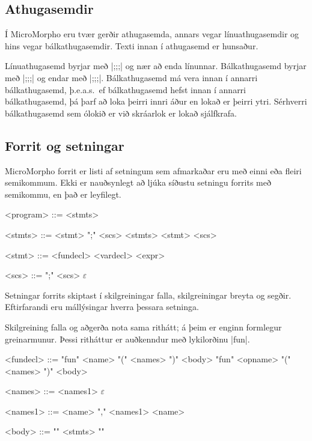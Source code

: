 \documentclass[12pt]{article}
\makeatletter
\newenvironment{bnf}[2]{%
    \setlength{\grammarindent}{\widthof{\synt{#2}::=} + 0.85em}
    \def\@grammarname{#1}
    \begin{grammarfloat}[H]
    \begin{mdframed}[style=langframe]
    \vspace{-\grammarparsep}
    \begin{grammar}
}{%
    \end{grammar}
    \end{mdframed}
    \vspace{-10pt}
    \caption{\@grammarname}
    \end{grammarfloat}
    \setlength{\grammarindent}{2em}
}
\renewcommand*{\empty}{\ensuremath{\varepsilon}}
\makeatother
\begin{document}
\subsection{Athugasemdir}
Í MicroMorpho eru tvær gerðir athugasemda, annars vegar línuathugasemdir og hins vegar bálkathugasemdir.
Texti innan í athugasemd er hunsaður.

Línuathugasemd byrjar með |;;;| og nær að enda línunnar.
Bálkathugasemd byrjar með |{;;;| og endar með |;;;}|.
Bálkathugasemd má vera innan í annarri bálkathugasemd, þ.e.a.s.~ef
bálkathugasemd hefst innan í annarri bálkathugasemd, þá þarf að loka þeirri innri
áður en lokað er þeirri ytri.
Sérhverri bálkathugasemd sem ólokið er við skráarlok er lokað sjálfkrafa.

\subsection{Forrit og setningar}\label{program}
MicroMorpho forrit er listi af setningum sem afmarkaðar eru með einni eða fleiri semikommum.
Ekki er nauðsynlegt að ljúka síðustu setningu forrits með semikommu, en það er leyfilegt.

\begin{bnf}{Forrit}{program}
    <program> ::= <stmts>

    <stmts> ::= <stmt> ";" <scs> <stmts>
           \alt <stmt> <scs>

    <stmt> ::= <fundecl>
          \alt <vardecl>
          \alt <expr>

    <scs> ::= ";" <scs>
         \alt \empty
\end{bnf}

Setningar forrits skiptast í skilgreiningar falla, skilgreiningar breyta og segðir.
Eftirfarandi eru mállýsingar hverra þessara setninga.

Skilgreining falla og aðgerða nota sama rithátt;
á þeim er enginn formlegur greinarmunur.
Þessi ritháttur er auðkenndur með lykilorðinu |fun|.

\begin{bnf}{Fallsskilgreining}{names1}
    <fundecl> ::= "fun" <name> "(" <names> ")" <body>
             \alt "fun" <opname> "(" <names> ")" <body>

    <names> ::= <names1>
           \alt \empty

    <names1> ::= <name> "," <names1>
            \alt <name>

    <body> ::= "{" <stmts> "}"
\end{bnf}
\end{document}
